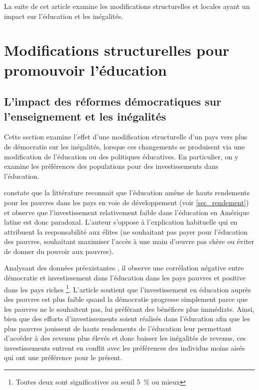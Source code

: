 \documentclass[pagesize, twoside=off, bibliography=totoc, DIV=calc, fontsize=12pt, a4paper, french]{scrartcl}
\begin{document}
La suite de cet article examine les modifications structurelles et locales ayant un impact sur l’éducation et les inégalités.

\section{Modifications structurelles pour promouvoir l’éducation}

\label{sec_struc}

\subsection{L’impact des réformes démocratiques sur l’enseignement et les inégalités}

Cette section examine l’effet d’une modification structurelle d’un pays vers plus de démocratie sur les inégalités, lorsque ces changements se produisent via une modification de l’éducation ou des politiques éducatives. En particulier, on y examine les préférences des populations pour des investissements dans l’éducation.

 constate que la littérature reconnait que l’éducation amène de hauts rendements pour les pauvres dans les pays en voie de développement (voir \cref{sec_rendement}) et observe que l’investissement relativement faible dans l’éducation en Amérique latine est donc paradoxal. L’auteur s’oppose à l’explication habituelle \citep{sokoloff_history_2000, acemoglu_economic_2005} qui en attribuent la responsabilité aux élites (ne souhaitant pas payer pour l’éducation des pauvres, souhaitant maximiser l’accès à une main d’œuvre pas chère ou éviter de donner du pouvoir aux pauvres).

Analysant des données préexistantes \citep{mulligan_democraties_2004}, il observe une corrélation négative entre démocratie et investissement dans l’éducation dans les pays pauvres et positive dans les pays riches \footnote{Toutes deux sont significatives au seuil \SI{5}{\percent} ou mieux}. L’article soutient que l’investissement en éducation auprès des pauvres est plus faible quand la démocratie progresse simplement parce que les pauvres ne le souhaitent pas, lui préférant des bénéfices plus immédiats. Ainsi, bien que des efforts d’investissements soient réalisés dans l’éducation afin que les plus pauvres jouissent de hauts rendements de l’éducation leur permettant d’accéder à des revenus plus élevés et donc baisser les inégalités de revenus, ces investissements entrent en conflit avec les préférences des individus moins aisés qui ont une préférence pour le présent. 
\end{document}
